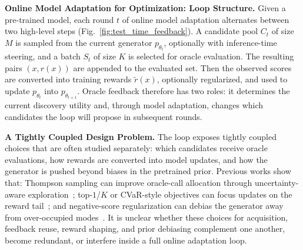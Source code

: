 \textbf{Online Model Adaptation for Optimization:  Loop Structure.} 
 Given a pre-trained model, each round $t$ of online model adaptation alternates between two high-level steps (Fig.~\ref{fig:test_time_feedback}). A candidate pool $C_t$ of size $M$ is sampled from the current generator $p_{\theta_t}$, optionally with inference-time steering, and a batch $S_t$ of size $K$ is selected for oracle evaluation. The resulting pairs $(x,r(x))$ are appended to the evaluated set. Then the observed scores are converted into training rewards $\tilde{r}(x)$, optionally regularized, and used to update $p_{\theta_t}$ into $p_{\theta_{t+1}}$. Oracle feedback therefore has two roles: it determines the current discovery utility and, through model adaptation, changes which candidates the loop will propose in subsequent rounds.





\textbf{A Tightly Coupled Design Problem.}
 The loop exposes tightly coupled choices that are often studied separately: which candidates receive oracle evaluations, how rewards are converted into model updates, and how the generator is pushed beyond biases in the pretrained prior. Previous works show that: Thompson sampling can improve oracle-call allocation through uncertainty-aware exploration~\citep[][]{ueharaFeedbackEfficientOnline2024, lattimore2020bandit}; top-$1$/$K$ or CVaR-style objectives can focus updates on the reward tail~\citep[e.g.,][]{santiFlowDensityControl, wang2026efficient}; and negative-score regularization can debias the generator away from over-occupied modes~\citep[][]{de2025provable, santiFlowDensityControl, santiVerifierConstrainedFlowExpansion2026}.
It is unclear whether these choices for acquisition, feedback reuse, reward shaping, and prior debiasing complement one another, become redundant, or interfere inside a full online adaptation loop.

